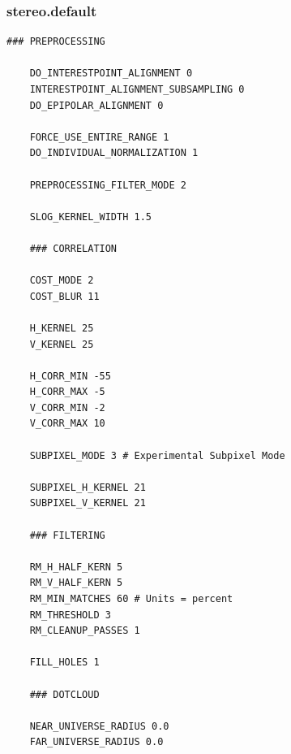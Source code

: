 \subsubsection*{stereo.default}

\begin{center}\begin{minipage}{5.5in}
\begin{Verbatim}[frame=single,fontsize=\small,label=stereo.default for Cassini ISS]
    ### PREPROCESSING

    DO_INTERESTPOINT_ALIGNMENT 0
    INTERESTPOINT_ALIGNMENT_SUBSAMPLING 0
    DO_EPIPOLAR_ALIGNMENT 0

    FORCE_USE_ENTIRE_RANGE 1
    DO_INDIVIDUAL_NORMALIZATION 1

    PREPROCESSING_FILTER_MODE 2

    SLOG_KERNEL_WIDTH 1.5

    ### CORRELATION

    COST_MODE 2
    COST_BLUR 11

    H_KERNEL 25
    V_KERNEL 25

    H_CORR_MIN -55
    H_CORR_MAX -5
    V_CORR_MIN -2
    V_CORR_MAX 10

    SUBPIXEL_MODE 3 # Experimental Subpixel Mode

    SUBPIXEL_H_KERNEL 21
    SUBPIXEL_V_KERNEL 21

    ### FILTERING

    RM_H_HALF_KERN 5
    RM_V_HALF_KERN 5
    RM_MIN_MATCHES 60 # Units = percent
    RM_THRESHOLD 3
    RM_CLEANUP_PASSES 1

    FILL_HOLES 1

    ### DOTCLOUD

    NEAR_UNIVERSE_RADIUS 0.0
    FAR_UNIVERSE_RADIUS 0.0
\end{Verbatim}
\end{minipage}\end{center}
